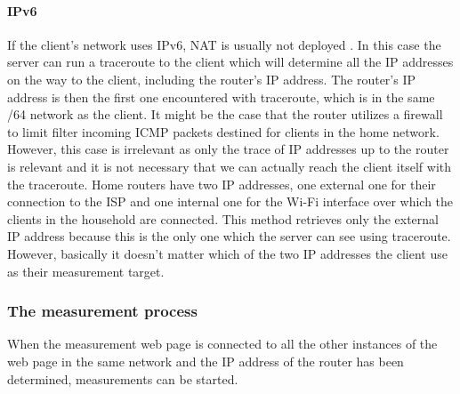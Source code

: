 \documentclass{sig-alternate-10pt}
\begin{document}
\paragraph{IPv6}If the client's network uses IPv6, NAT is usually not deployed \cite{zhang_iab_2010}. In this case the server can run a traceroute to the client which will determine all the IP addresses on the way to the client, including the router's IP address. The router's IP address is then the first one encountered with traceroute, which is in the same /64 network as the client. It might be the case that the router utilizes a firewall to limit filter incoming ICMP packets destined for clients in the home network. However, this case is irrelevant as only the trace of IP addresses up to the router is relevant and it is not necessary that we can actually reach the client itself with the traceroute. 
 Home routers have two IP addresses, one external one for their connection to the ISP and one internal one for the Wi-Fi interface over which the clients in the household are connected. This method retrieves only the external IP address because this is the only one which the server can see using traceroute. However, basically it doesn't matter which of the two IP addresses the client use as their measurement target. 

\subsubsection{The measurement process}

When the measurement web page is connected to all the other instances of the web page in the same network and the IP address of the router has been determined, measurements can be started. 
\end{document}
